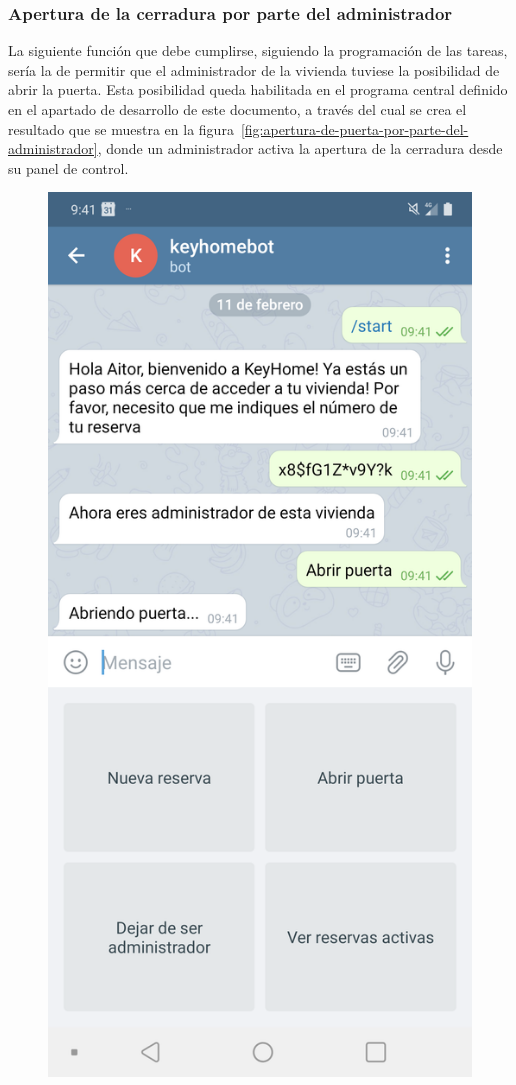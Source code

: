 \subsubsection{Apertura de la cerradura por parte del administrador}

La siguiente función que debe cumplirse, siguiendo la programación de las tareas, sería la de permitir que el administrador de la vivienda tuviese la posibilidad de abrir la puerta. Esta posibilidad queda habilitada en el programa central definido en el apartado de desarrollo de este documento, a través del cual se crea el resultado que se muestra en la figura~\ref{fig:apertura-de-puerta-por-parte-del-administrador}, donde un administrador activa la apertura de la cerradura desde su panel de control.

\begin{figure}[tbp]
\centering
\includegraphics[scale=0.15]{fig/Apertura-de-puerta-administrador.png}

\end{figure}
